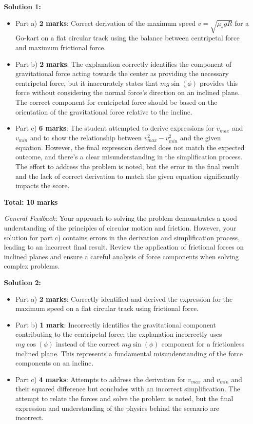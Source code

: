 \documentclass[a4paper,11pt]{article}
\begin{document}
\textbf{Solution 1:}
\begin{itemize}
    \item Part a) \textbf{2 marks}: Correct derivation of the maximum speed \(v = \sqrt{\mu_s g R}\) for a Go-kart on a flat circular track using the balance between centripetal force and maximum frictional force.
    \item Part b) \textbf{2 marks}: The explanation correctly identifies the component of gravitational force acting towards the center as providing the necessary centripetal force, but it inaccurately states that \(mg\sin(\phi)\) provides this force without considering the normal force's direction on an inclined plane. The correct component for centripetal force should be based on the orientation of the gravitational force relative to the incline.
    \item Part c) \textbf{6 marks}: The student attempted to derive expressions for \(v_{max}\) and \(v_{min}\) and to show the relationship between \(v_{max}^2 - v_{min}^2\) and the given equation. However, the final expression derived does not match the expected outcome, and there's a clear misunderstanding in the simplification process. The effort to address the problem is noted, but the error in the final result and the lack of correct derivation to match the given equation significantly impacts the score.
\end{itemize}

\textbf{Total: 10 marks}

\textit{General Feedback:} Your approach to solving the problem demonstrates a good understanding of the principles of circular motion and friction. However, your solution for part c) contains errors in the derivation and simplification process, leading to an incorrect final result. Review the application of frictional forces on inclined planes and ensure a careful analysis of force components when solving complex problems.

\textbf{Solution 2:}
\begin{itemize}
    \item Part a) \textbf{2 marks}: Correctly identified and derived the expression for the maximum speed on a flat circular track using frictional force.
    \item Part b) \textbf{1 mark}: Incorrectly identifies the gravitational component contributing to the centripetal force; the explanation incorrectly uses \(mg\cos(\phi)\) instead of the correct \(mg\sin(\phi)\) component for a frictionless inclined plane. This represents a fundamental misunderstanding of the force components on an incline.
    \item Part c) \textbf{4 marks}: Attempts to address the derivation for \(v_{max}\) and \(v_{min}\) and their squared difference but concludes with an incorrect simplification. The attempt to relate the forces and solve the problem is noted, but the final expression and understanding of the physics behind the scenario are incorrect.
\end{itemize}
\end{document}
